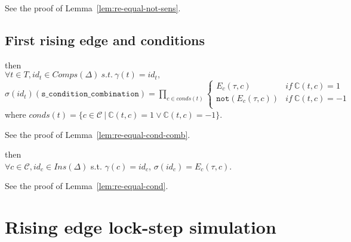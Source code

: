 \documentclass[dvipsnames,12pt]{article}
\begin{document}
\begin{niproof}
  See the proof of Lemma~\ref{lem:re-equal-not-sens}.
\end{niproof}

\subsection{First rising edge and conditions}
\label{sec:fst-re-cond-comb}

\begin{lemma}
  \label{lem:fst-re-equal-cond-comb}
  \fstrehyps{} then\\
  $\forall{}t\in{}T,id_t\in{}Comps(\Delta)~s.t.~\gamma(t)=id_t,$\\
  $\sigma(id_t)(\texttt{s\_condition\_combination})=
  \prod\limits_{c\in{}conds(t)}
  \begin{cases}
    E_c(\tau,c) & if~\mathbb{C}(t,c)=1 \\
    \mathtt{not}(E_c(\tau,c)) & if~\mathbb{C}(t,c)=-1 \\
  \end{cases}$\\
  where
  $conds(t)=\{c\in\mathcal{C}~\vert~\mathbb{C}(t,c)=1\lor\mathbb{C}(t,c)=-1\}$.
\end{lemma}

\begin{niproof}
  See the proof of Lemma~\ref{lem:re-equal-cond-comb}.
\end{niproof}

\begin{lemma}
  \label{lem:fst-re-equal-cond}
  \fstrehyps{} then\\
  $\forall{}c\in\mathcal{C},id_c\in{}Ins(\Delta)$
  s.t. $\gamma(c)=id_c$, $\sigma(id_c)=E_c(\tau,c)$.
\end{lemma}

\begin{niproof}
  See the proof of Lemma~\ref{lem:re-equal-cond}.
\end{niproof}

\section{Rising edge lock-step simulation}
\label{sec:re-lock-step}
\end{document}
